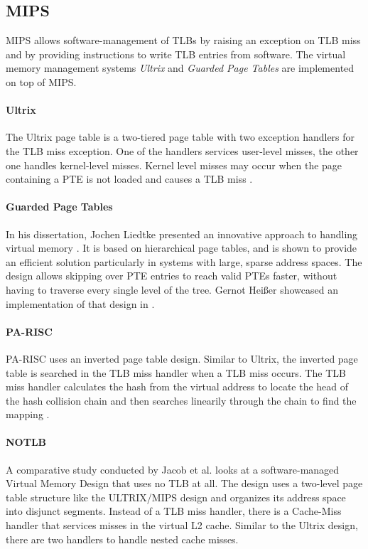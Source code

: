 \subsection{MIPS}
MIPS \cite{MIPSArchitectureProgrammers2016} allows software-management of TLBs by raising an exception on TLB miss and by providing instructions to write TLB entries from software.
The virtual memory management systems \textit{Ultrix} and \textit{Guarded Page Tables} are implemented on top of MIPS.

\paragraph{Ultrix} The Ultrix page table is a two-tiered page table with two exception handlers for the TLB miss exception.
One of the handlers services user-level misses, the other one handles kernel-level misses.
Kernel level misses may occur when the page containing a PTE is not loaded and causes a
TLB miss \cite{jacob1998look}.

\paragraph{Guarded Page Tables} In his dissertation, Jochen Liedtke presented an innovative approach
to handling virtual memory \cite{liedtkeGPT}.
It is based on hierarchical page tables, and is shown to provide an efficient solution particularly in systems with large, sparse address spaces.
The design allows skipping over PTE entries to reach valid PTEs faster, without having to traverse every single level of the tree.
Gernot Heißer showcased an implementation of that design in \cite{heiserAnatomyHighPerformanceMicrokernel}.

\paragraph{PA-RISC}
PA-RISC uses an inverted page table design. Similar to Ultrix, the inverted page table is searched in the TLB miss handler when a TLB miss occurs.
The TLB miss handler calculates the hash from the virtual address to locate the head of the hash collision chain and then searches linearily through the chain to find the mapping \cite{jacob1998look}.

\paragraph{NOTLB}
A comparative study conducted by Jacob et al. \cite{jacob1998look} looks at a software-managed Virtual Memory Design that uses no TLB at all.
The design uses a two-level page table structure like the ULTRIX/MIPS design and organizes its address space into disjunct segments.
Instead of a TLB miss handler, there is a Cache-Miss handler that services misses in the virtual L2 cache.
Similar to the Ultrix design, there are two handlers to handle nested cache misses.


